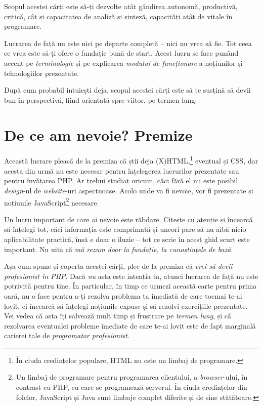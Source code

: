 Scopul acestei cărți este să-ți dezvolte atât gândirea autonomă, productivă,
critică, cât și capacitatea de analiză și sinteză, capacități atât de vitale
în programare.

Lucrarea de față nu este nici pe departe completă -- nici nu vrea să fie.
Tot ceea ce vrea este să-ți ofere o fundație bună de start. Acest lucru se 
face punând accent pe \textit{terminologie} și pe explicarea
\textit{modului de funcționare} a noțiunilor și tehnologiilor prezentate.

După cum probabil intuiești deja, scopul acestei cărți este să
te susțină să devii bun în perspectivă, fiind orientată spre
viitor, pe termen lung.

{}
\section*{De ce am nevoie? Premize}
Această lucrare pleacă de la premiza că știi deja (X)HTML,\footnote{În
ciuda credințelor populare, HTML nu este un limbaj de programare.} eventual și CSS, dar
acesta din urmă nu este necesar pentru înțelegerea lucrurilor prezentate
sau pentru învățarea PHP. Ar trebui
studiat oricum, căci fără el nu este posibil \textsl{design}-ul de
\textsl{website}-uri aspectuoase.
Acolo unde va fi nevoie, vor fi prezentate și noțiunile JavaScript\footnote{Un
limbaj de programare pentru programarea clientului, a \textsl{browser}-ului,
în contrast cu PHP, cu care se programează \glqq serverul\grqq.
În ciuda credințelor din folclor, JavaScript și Java sunt limbaje complet
diferite și de sine stătătoare.} necesare.

Un lucru important de care ai nevoie este răbdare. Citește cu
atenție și încearcă să înțelegi tot, căci informația este comprimată
și uneori pare să nu aibă nicio aplicabilitate practică, însă e doar o
iluzie -- tot ce scrie în acest ghid scurt este important. Nu uita că
\textit{mă rezum doar la fundație, la cunoștințele de bază}.

Așa cum spune și coperta acestei cărți, plec de la premiza că
\textit{vrei să devii profesionist în PHP}. Dacă \textit{nu} asta este intenția ta,
atunci lucrarea de față nu este potrivită pentru tine.
În particular, în timp ce urmezi această carte pentru prima oară, nu o face
pentru a-ți rezolva problema ta imediată de care tocmai te-ai lovit, ci
încearcă să înțelegi noțiunile expuse și să rezolvi exercițiile prezentate.
Vei vedea că asta îți salvează mult timp și frustrare pe \textit{termen lung},
și că rezolvarea eventualei probleme imediate de care te-ai lovit este de fapt
marginală carierei tale de \textit{programator profesionist}.

